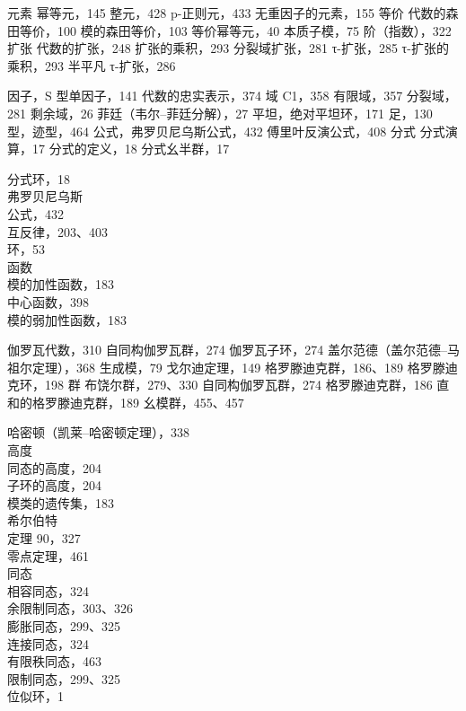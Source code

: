 
元素 幂等元，145 整元，428 p-正则元，433 无重因子的元素，155 等价 代数的森田等价，100 模的森田等价，103 等价幂等元，40 本质子模，75 阶（指数），322 扩张 代数的扩张，248 扩张的乘积，293 分裂域扩张，281 τ-扩张，285 τ-扩张的乘积，293 半平凡 τ-扩张，286


因子，S 型单因子，141 代数的忠实表示，374 域 C1，358 有限域，357 分裂域，281 剩余域，26 菲廷（韦尔–菲廷分解），27 平坦，绝对平坦环，171 足，130 型，迹型，464 公式，弗罗贝尼乌斯公式，432 傅里叶反演公式，408 分式 分式演算，17 分式的定义，18 分式幺半群，17

分式环，18\\
弗罗贝尼乌斯\\
公式，432\\
互反律，203、403\\
环，53\\
函数\\
模的加性函数，183\\
中心函数，398\\
模的弱加性函数，183


伽罗瓦代数，310 自同构伽罗瓦群，274 伽罗瓦子环，274 盖尔范德（盖尔范德–马祖尔定理），368 生成模，79 戈尔迪定理，149 格罗滕迪克群，186、189 格罗滕迪克环，198 群 布饶尔群，279、330 自同构伽罗瓦群，274 格罗滕迪克群，186 直和的格罗滕迪克群，189 幺模群，455、457


哈密顿（凯莱–哈密顿定理），338\\
高度\\
同态的高度，204\\
子环的高度，204\\
模类的遗传集，183\\
希尔伯特\\
定理 90，327\\
零点定理，461\\
同态\\
相容同态，324\\
余限制同态，303、326\\
膨胀同态，299、325\\
连接同态，324\\
有限秩同态，463\\
限制同态，299、325\\
位似环，1


